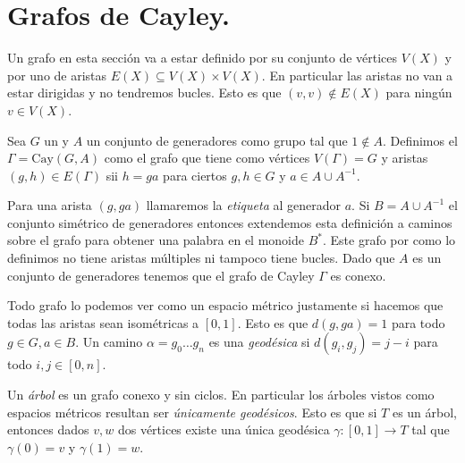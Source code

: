 \documentclass[tesis.tex]{subfiles}
\begin{document}
	
\chapter{Grafos de Cayley.} \label{seccion_treewidth}

Un grafo en esta sección va a estar definido por su conjunto de vértices $V(X)$ y por uno de aristas $E(X) \subseteq V(X) \times V(X)$.
En particular las aristas no van a estar dirigidas y no tendremos bucles.
Esto es que $(v,v) \notin E(X)$ para ningún $v \in V(X)$.

\begin{deff}
	Sea $G$ un \fg y $A$ un conjunto de generadores como grupo tal que $1 \notin A$.
	Definimos el  $\Gamma = \text{Cay}(G,A)$ como el grafo que tiene como vértices $V(\Gamma) = G$ y aristas $(g,h) \in E(\Gamma)$ sii $h=ga$ para ciertos $g,h \in G$ y $a \in A \cup A^{-1}$. 
\end{deff}

Para una arista $(g,ga)$ llamaremos la \emph{etiqueta} al generador $a$.
Si $B = A \cup A^{-1}$ el conjunto simétrico de generadores entonces extendemos esta definición a caminos sobre el grafo para obtener una palabra en el monoide $B^*$.
Este grafo por como lo definimos no tiene aristas múltiples ni tampoco tiene bucles.
Dado que $A$ es un conjunto de generadores tenemos que el grafo de Cayley $\Gamma$ es conexo.

Todo grafo lo podemos ver como un espacio métrico justamente si hacemos que todas las aristas sean isométricas a $[0,1]$. 
Esto es que $d(g,ga) = 1$ para todo $g \in G, a \in B$. 
Un camino $\alpha = g_0 \dots g_n$ es una \emph{geodésica} si $d(g_i,g_j) = j-i$ para todo $i,j \in [0,n]$.


Un \emph{árbol} es un grafo conexo y sin ciclos. 
En particular los árboles vistos como espacios métricos resultan ser \emph{únicamente geodésicos}. 
Esto es que si $T$ es un árbol, entonces dados $v,w$ dos vértices existe una única geodésica $\gamma:[0,1] \to T$ tal que $\gamma(0)=v$ y $\gamma(1)=w$.

%	
%	
\end{document}
